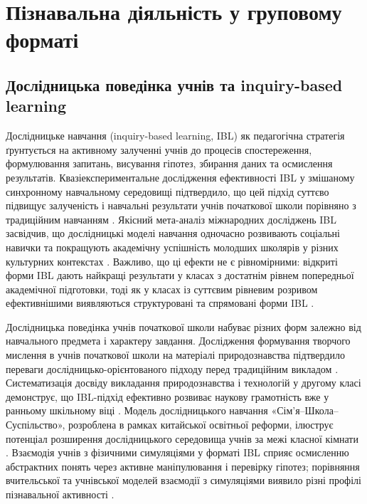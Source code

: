 \documentclass[a4paper,14pt]{extarticle}
\begin{document}
\newpage

\section{Пізнавальна діяльність у груповому форматі}

\subsection{Дослідницька поведінка учнів та inquiry-based learning}

Дослідницьке навчання (inquiry-based learning, IBL) як педагогічна стратегія ґрунтується на активному залученні учнів до процесів спостереження, формулювання запитань, висування гіпотез, збирання даних та осмислення результатів. Квазіекспериментальне дослідження ефективності IBL у змішаному синхронному навчальному середовищі підтвердило, що цей підхід суттєво підвищує залученість і навчальні результати учнів початкової школи порівняно з традиційним навчанням \parencite{Xu2026}. Якісний мета-аналіз міжнародних досліджень IBL засвідчив, що дослідницькі моделі навчання одночасно розвивають соціальні навички та покращують академічну успішність молодших школярів у різних культурних контекстах \parencite{Seprie2025}. Важливо, що ці ефекти не є рівномірними: відкриті форми IBL дають найкращі результати у класах з достатнім рівнем попередньої академічної підготовки, тоді як у класах із суттєвим рівневим розривом ефективнішими виявляються структуровані та спрямовані форми IBL \parencite{Aminga2026}.

Дослідницька поведінка учнів початкової школи набуває різних форм залежно від навчального предмета і характеру завдання. Дослідження формування творчого мислення в учнів початкової школи на матеріалі природознавства підтвердило переваги дослідницько-орієнтованого підходу перед традиційним викладом \parencite{Leasa2025318}. Систематизація досвіду викладання природознавства і технологій у другому класі демонструє, що IBL-підхід ефективно розвиває наукову грамотність вже у ранньому шкільному віці \parencite{Zuñiga-Quispe2025365}. Модель дослідницького навчання «Сім'я–Школа–Суспільство», розроблена в рамках китайської освітньої реформи, ілюструє потенціал розширення дослідницького середовища учнів за межі класної кімнати \parencite{Xia2025340}. Взаємодія учнів з фізичними симуляціями у форматі IBL сприяє осмисленню абстрактних понять через активне маніпулювання і перевірку гіпотез; порівняння вчительської та учнівської моделей взаємодії з симуляціями виявило різні профілі пізнавальної активності \parencite{Magkouta2024253}.
\end{document}
